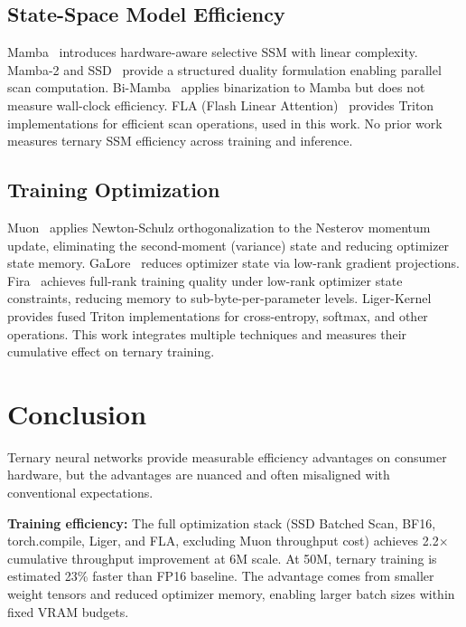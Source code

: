 \documentclass{article}
\begin{document}
\subsection{State-Space Model Efficiency}

Mamba~\citep{gu2024mamba} introduces hardware-aware selective SSM with linear complexity. Mamba-2 and SSD~\citep{dao2024transformers} provide a structured duality formulation enabling parallel scan computation. Bi-Mamba~\citep{bimamba2024} applies binarization to Mamba but does not measure wall-clock efficiency. FLA (Flash Linear Attention)~\citep{yang2024fla} provides Triton implementations for efficient scan operations, used in this work. No prior work measures ternary SSM efficiency across training and inference.

\subsection{Training Optimization}

Muon~\citep{jordan2024muon} applies Newton-Schulz orthogonalization to the Nesterov momentum update, eliminating the second-moment (variance) state and reducing optimizer state memory. GaLore~\citep{zhao2024galore} reduces optimizer state via low-rank gradient projections. Fira~\citep{fira2025} achieves full-rank training quality under low-rank optimizer state constraints, reducing memory to sub-byte-per-parameter levels. Liger-Kernel~\citep{hsu2024liger} provides fused Triton implementations for cross-entropy, softmax, and other operations. This work integrates multiple techniques and measures their cumulative effect on ternary training.

\section{Conclusion}

Ternary neural networks provide measurable efficiency advantages on consumer hardware, but the advantages are nuanced and often misaligned with conventional expectations.

\textbf{Training efficiency:} The full optimization stack (SSD Batched Scan, BF16, torch.compile, Liger, and FLA, excluding Muon throughput cost) achieves 2.2$\times$ cumulative throughput improvement at 6M scale. At 50M, ternary training is estimated 23\% faster than FP16 baseline. The advantage comes from smaller weight tensors and reduced optimizer memory, enabling larger batch sizes within fixed VRAM budgets.
\end{document}

